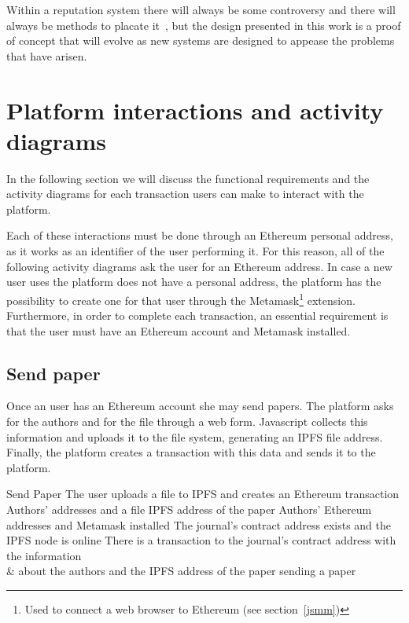 Within a reputation system there will always be some controversy and there will
always be methods to placate it~\cite{dellarocas2000immunizing}, but the design
presented in this work is a proof of concept that will evolve as new systems are
designed to appease the problems that have arisen.


\section{Platform interactions and activity diagrams}
\label{sec:funct-requ-activ}

In the following section we will discuss the functional requirements and the
activity diagrams for each transaction users can make to interact with the
platform.

Each of these interactions must be done through an Ethereum personal address, as
it works as an identifier of the user performing it. For this reason, all of the
following activity diagrams ask the user for an Ethereum address. In case a new
user uses the platform does not have a personal address, the platform has the
possibility to create one for that user through the Metamask\footnote{Used to
  connect a web browser to Ethereum (see section~\ref{jsmm})} extension.
Furthermore, in order to complete each transaction, an essential requirement is
that the user must have an Ethereum account and Metamask installed.

\subsection*{Send paper}

Once an user has an Ethereum account she may send papers. The platform asks for
the authors and for the file through a web form. Javascript collects this
information and uploads it to the file system, generating an IPFS file address.
Finally, the platform creates a transaction with this data and sends it to the
platform.

{Send Paper}%
{The user uploads a file to IPFS and creates an Ethereum
  transaction}%
{Authors' addresses and a file}%
{IPFS address of the paper}%
{Authors' Ethereum addresses and Metamask installed}%
{The journal's contract address exists and the IPFS node is
  online}%
{There is a transaction to the journal's contract address with the information\\
  & about the authors and the IPFS address of the paper }%
{sending a paper}%

